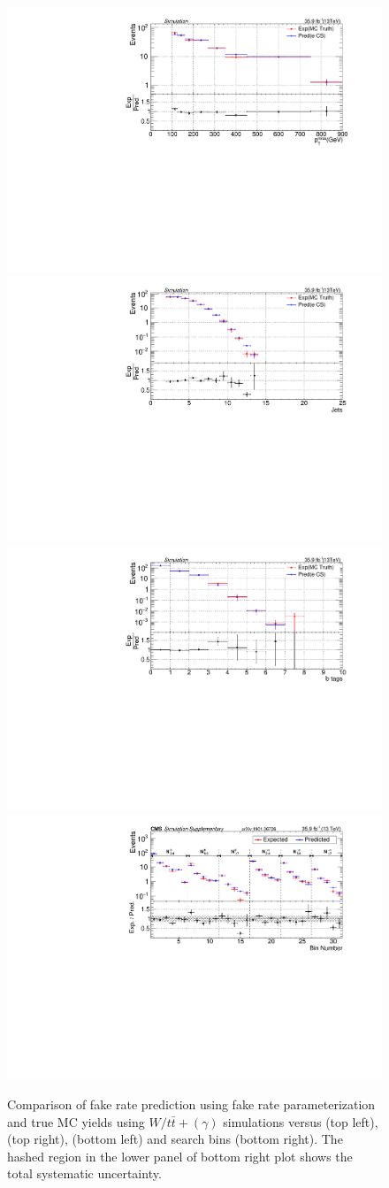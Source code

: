\begin{figure}[h!]                           
\centering
\includegraphics[width=0.48\linewidth]{../Figures/Chap3/fake_rate_closure/fakeRateClosure_met.pdf}
\includegraphics[width=0.48\linewidth]{../Figures/Chap3/fake_rate_closure/fakeRateClosure_njets.pdf}\\
\includegraphics[width=0.48\linewidth]{../Figures/Chap3/fake_rate_closure/fakeRateClosure_btags.pdf}
\includegraphics[width=0.48\linewidth]{../Figures/Chap3/anaPublic/fakerateClosure}
\captionsetup{width=.9\linewidth}
\caption[Fake rate closures]{Comparison of fake rate prediction using fake rate parameterization
and true MC yields using $W/t\bar{t}+(\gamma)$ simulations versus \ptmiss (top left), 
\nj (top right), \nb (bottom left) and search bins (bottom right). The hashed region in the lower panel 
of bottom right plot shows the total systematic uncertainty.}
\label{fig:fakeRateClosure}
\end{figure}

